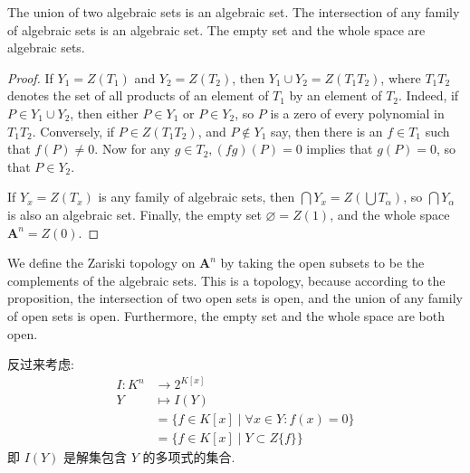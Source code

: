 \begin{proposition}
  The union of two algebraic sets is an algebraic set. The intersection of any family of algebraic sets is an algebraic set. The empty set and the whole space are algebraic sets.
\end{proposition}
\begin{proof}
  If $Y_1=Z\left(T_1\right)$ and $Y_2=Z\left(T_2\right)$, then $Y_1 \cup Y_2=Z\left(T_1 T_2\right)$, where $T_1 T_2$ denotes the set of all products of an element of $T_1$ by an element of $T_2$. Indeed, if $P \in Y_1 \cup Y_2$, then either $P \in Y_1$ or $P \in Y_2$, so $P$ is a zero of every polynomial in $T_1 T_2$. Conversely, if $P \in Z\left(T_1 T_2\right)$, and $P \notin Y_1$ say, then there is an $f \in T_1$ such that $f(P) \neq 0$. Now for any $g \in T_2,(f g)(P)=0$ implies that $g(P)=0$, so that $P \in Y_2$.

If $Y_x=Z\left(T_x\right)$ is any family of algebraic sets, then $\bigcap Y_x=Z\left(\bigcup T_\alpha\right)$, so $\bigcap Y_\alpha$ is also an algebraic set. Finally, the empty set $\varnothing=Z(1)$, and the whole space $\mathbf{A}^n=Z(0)$.
\end{proof}
\begin{definition}
  We define the Zariski topology on $\mathbf{A}^n$ by taking the open subsets to be the complements of the algebraic sets. This is a topology, because according to the proposition, the intersection of two open sets is open, and the union of any family of open sets is open. Furthermore, the empty set and the whole space are both open.
\end{definition}

反过来考虑:
\begin{equation}\label{eq:zero set2}
\begin{aligned}
I: K^n & \rightarrow 2^{K[x]} \\
Y & \mapsto I(Y) \\
& =\{f \in K[x] \mid \forall x \in Y: f(x)=0\} \\
& =\{f \in K[x] \mid Y \subset Z\{f\}\}
\end{aligned}
\end{equation}
即 $I(Y)$ 是解集包含 $Y$ 的多项式的集合.

